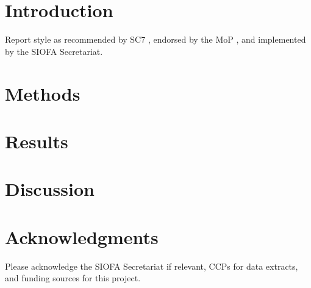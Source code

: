 \section{Introduction}

Report style as recommended by SC7 \citep{SC7}, endorsed by the MoP \citep{MoP9}, and implemented by the SIOFA Secretariat.

\section{Methods}

\section{Results}

\section{Discussion}

\section{Acknowledgments}

Please acknowledge the SIOFA Secretariat if relevant, CCPs for data extracts, and funding sources for this project.
 